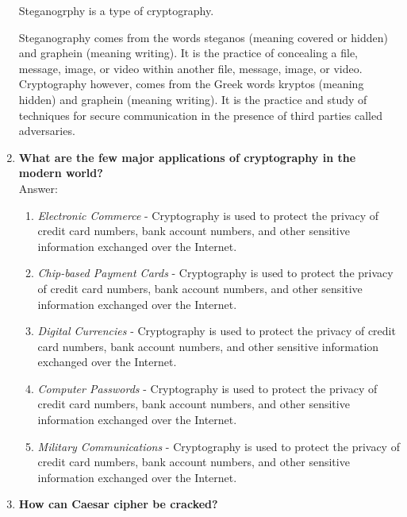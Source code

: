 \documentclass[11pt]{article}
\begin{document}
\begin{enumerate}
	      Steganogrphy is a type of cryptography.

	      Steganography comes from the words steganos (meaning covered or hidden) and graphein (meaning writing). It is the practice of concealing a file, message, image, or video within another file, message, image, or video.\\

	      Cryptography however, comes from the Greek words kryptos (meaning hidden) and graphein (meaning writing). It is the practice and study of techniques for secure communication in the presence of third parties called adversaries.\\

	\item \textbf{What are the few major applications of cryptography in the modern world?}\\
	      Answer:
	      \begin{enumerate}
		      \item \textit{Electronic Commerce} - Cryptography is used to protect the privacy of credit card numbers, bank account numbers, and other sensitive information exchanged over the Internet.
		      \item \textit{Chip-based Payment Cards} - Cryptography is used to protect the privacy of credit card numbers, bank account numbers, and other sensitive information exchanged over the Internet.
		      \item \textit{Digital Currencies} - Cryptography is used to protect the privacy of credit card numbers, bank account numbers, and other sensitive information exchanged over the Internet.
		      \item \textit{Computer Passwords} - Cryptography is used to protect the privacy of credit card numbers, bank account numbers, and other sensitive information exchanged over the Internet.
		      \item \textit{Military Communications} - Cryptography is used to protect the privacy of credit card numbers, bank account numbers, and other sensitive information exchanged over the Internet.
	      \end{enumerate}

	\item \textbf{How can Caesar cipher be cracked?}\\


\end{enumerate}
\end{document}

